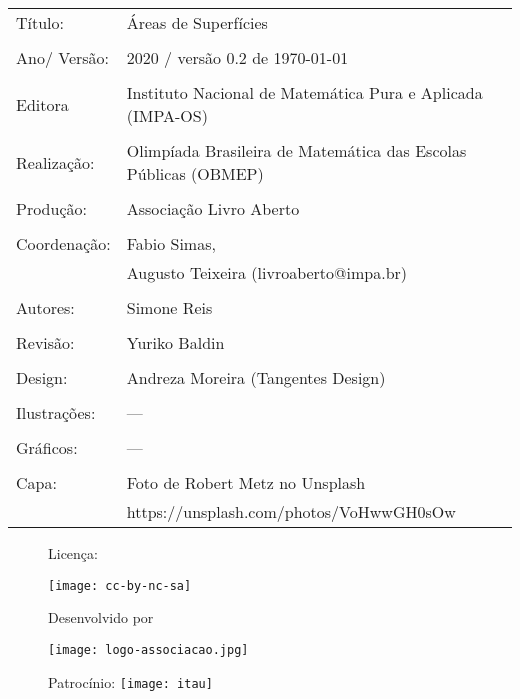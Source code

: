 \begin{tabular}{p{}p{}}
Título: & Áreas de Superfícies\\
\\
Ano/ Versão: & 2020 / versão 0.2 de \today\\
\\
Editora & Instituto Nacional de Matem\'atica Pura e Aplicada (IMPA-OS)\\
\\
Realização:& Olimp\'iada Brasileira de Matem\'atica das Escolas P\'ublicas (OBMEP)\\
\\
Produção:& Associação Livro Aberto\\
\\
Coordenação: & Fabio Simas, \\
             & Augusto Teixeira (livroaberto@impa.br)\\
\\
  Autores: & Simone Reis \\
\\
Revisão: & Yuriko Baldin \\
\\
Design: & Andreza Moreira (Tangentes Design) \\
\\
  Ilustrações: & --- \\ 
\\
Gráficos: & ---\\
\\
  Capa: & Foto de Robert Metz no Unsplash \\
        & https://unsplash.com/photos/VoHwwGH0sOw \\

\end{tabular}



\begin{figure}[b]
\begin{minipage}[l]{5cm}
\centering

{\large Licença:}

  \texttt{[image: cc-by-nc-sa]}
\end{minipage}\hfill
\begin{minipage}[c]{5cm}
\centering
{\large Desenvolvido por}

\texttt{[image: logo-associacao.jpg]}
\end{minipage}
\begin{minipage}[r]{5cm}
\centering

{\large Patrocínio:}
  \vspace{1em}
  \texttt{[image: itau]}
\end{minipage}
\end{figure}

